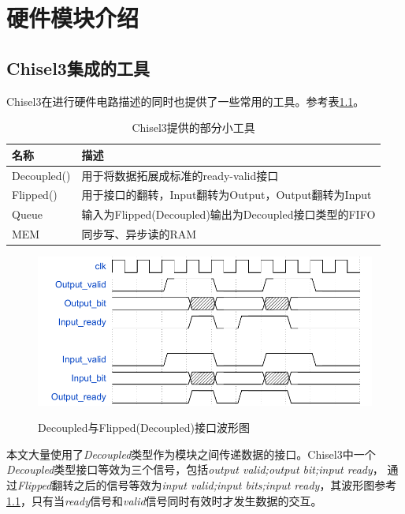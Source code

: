 \chapter{硬件模块介绍}
\section{Chisel3集成的工具}
Chisel3在进行硬件电路描述的同时也提供了一些常用的工具。参考表\ref{chisel-tool}。
\begin{table}[h] %
    \centering
    \caption{Chisel3提供的部分小工具} %
    \begin{tabular}{l|l} %
    \hline  
    \hline  
    名称 & 描述 \\ %
    \hline %
    Decoupled() & 用于将数据拓展成标准的ready-valid接口 \\  
    \hline %
    Flipped() & 用于接口的翻转，Input翻转为Output，Output翻转为Input \\  
    \hline  
    Queue & 输入为Flipped(Decoupled)输出为Decoupled接口类型的FIFO \\  
    \hline  
    MEM & 同步写、异步读的RAM \\  
    \hline  
    \hline  
    \end{tabular}  
    \label{chisel-tool}
\end{table}  
\begin{figure}[h]
    \centering
    \includegraphics{../pdf/decoupled.pdf}\\
    \caption{Decoupled与Flipped(Decoupled)接口波形图}
    \label{decoupled_w}
\end{figure}

本文大量使用了\emph{Decoupled}类型作为模块之间传递数据的接口。Chisel3中一个\emph{Decoupled}类型接口等效为三个信号，包括\emph{output valid;output bit;input ready}，
通过\emph{Flipped}翻转之后的信号等效为\emph{input valid;input bits;input ready}，其波形图参考\ref{decoupled_w}，只有当\emph{ready}信号和\emph{valid}信号同时有效时才发生数据的交互。

